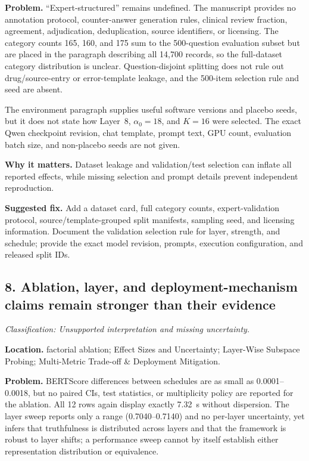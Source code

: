 \documentclass[11pt]{article}
\newcommand{\findinglabel}[1]{\textbf{#1}}
\newcommand{\classification}[1]{\textit{Classification: #1.}}
\begin{document}
\findinglabel{Problem.} ``Expert-structured'' remains undefined.  The manuscript provides no annotation protocol, counter-answer generation rules, clinical review fraction, agreement, adjudication, deduplication, source identifiers, or licensing.  The category counts 165, 160, and 175 sum to the 500-question evaluation subset but are placed in the paragraph describing all 14,700 records, so the full-dataset category distribution is unclear.  Question-disjoint splitting does not rule out drug/source-entry or error-template leakage, and the 500-item selection rule and seed are absent.

The environment paragraph supplies useful software versions and placebo seeds, but it does not state how Layer~8, $\alpha_0=18$, and $K=16$ were selected.  The exact Qwen checkpoint revision, chat template, prompt text, GPU count, evaluation batch size, and non-placebo seeds are not given.

\findinglabel{Why it matters.} Dataset leakage and validation/test selection can inflate all reported effects, while missing selection and prompt details prevent independent reproduction.

\findinglabel{Suggested fix.} Add a dataset card, full category counts, expert-validation protocol, source/template-grouped split manifests, sampling seed, and licensing information.  Document the validation selection rule for layer, strength, and schedule; provide the exact model revision, prompts, execution configuration, and released split IDs.

\subsection*{8. Ablation, layer, and deployment-mechanism claims remain stronger than their evidence}

\classification{Unsupported interpretation and missing uncertainty}

\findinglabel{Location.} factorial ablation; Effect Sizes and Uncertainty; Layer-Wise Subspace Probing; Multi-Metric Trade-off \& Deployment Mitigation.

\findinglabel{Problem.} BERTScore differences between schedules are as small as 0.0001--0.0018, but no paired CIs, test statistics, or multiplicity policy are reported for the ablation.  All 12 rows again display exactly 7.32~s without dispersion.  The layer sweep reports only a range (0.7040--0.7140) and no per-layer uncertainty, yet infers that truthfulness is distributed across layers and that the framework is robust to layer shifts; a performance sweep cannot by itself establish either representation distribution or equivalence.
\end{document}
